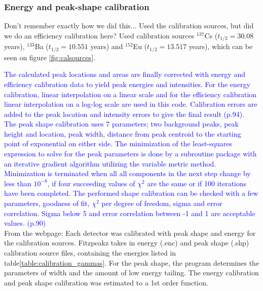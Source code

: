 \documentclass[a4paper,11pt,twoside]{book}
\begin{document}
\subsubsection{Energy and peak-shape calibration}
Don't remember exactly how we did this... Used the calibration sources, but did we do an efficiency calibration here? Used calibration sources $^{137}$Cs ($t_{1/2}=30.08$ years\cite{Browne2007}), $^{133}$Ba ($t_{1/2}=10.551$ years\cite{Khazov2011}) and $^{152}$Eu ($t_{1/2}=13.517$ years\cite{Martin2013}), which can be seen on figure \ref{fig:calsources}.

\textcolor{blue}{The calculated peak locations and areas are finally corrected with energy and efficiency calibration data to yield peak energies and intensities. For the energy calibration, linear interpolation on a linear scale and for the efficiency calibration linear interpolation on a log-log scale are used in this code. Calibration errors are added to the peak location and intensity errors to give the final result (p.94). \\ The peak shape calibration uses 7 parameters; two background peaks, peak height and location, peak width, distance from peak centroid to the starting point of exponential on either side. The minimization of the least-squares expression to solve for the peak parameters is done by a subroutine package  with an iterative gradient algorithm utilizing the variable metric method. Minimization is terminated when all all components in the next step change by less than $10^{-8}$, if four succeeding values of $\chi^2$ are the same or if 100 iterations have been completed. The performed shape calibration can be checked with a few parameters, goodness of fit, $\chi^2$ per degree of freedom, sigma and error correlation. Sigma below 5 and error correlation between -1 and 1 are acceptable values.  (p.90)} \\


From the webpage:
Each detector was calibrated with peak shape and energy for the calibration sources. Fitzpeakz takes in energy (.enc) and peak shape (.shp) calibration source files, containing the energies listed in table\ref{table:calibration_gammas}. For the peak shape, the program determines the parameters of width and the amount of low energy tailing. The energy calibration and peak shape calibration was estimated to a 1st order function. 
\end{document}
